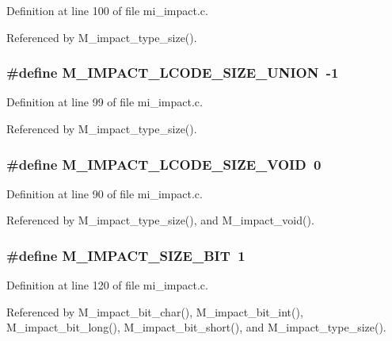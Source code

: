 Definition at line 100 of file mi\_\-impact.c.

Referenced by M\_\-impact\_\-type\_\-size().
\subsubsection{\setlength{\rightskip}{0pt plus 5cm}\#define M\_\-IMPACT\_\-LCODE\_\-SIZE\_\-UNION~-1}\label{mi__impact_8c_5d554a1c6dc4733ea2cddc22f4ea47f4}




Definition at line 99 of file mi\_\-impact.c.

Referenced by M\_\-impact\_\-type\_\-size().
\subsubsection{\setlength{\rightskip}{0pt plus 5cm}\#define M\_\-IMPACT\_\-LCODE\_\-SIZE\_\-VOID~0}\label{mi__impact_8c_13f29101fdb38b26b58fccbe1401f4f5}




Definition at line 90 of file mi\_\-impact.c.

Referenced by M\_\-impact\_\-type\_\-size(), and M\_\-impact\_\-void().
\subsubsection{\setlength{\rightskip}{0pt plus 5cm}\#define M\_\-IMPACT\_\-SIZE\_\-BIT~1}\label{mi__impact_8c_3ac692b34eb14d3d4372a0b83ad07543}




Definition at line 120 of file mi\_\-impact.c.

Referenced by M\_\-impact\_\-bit\_\-char(), M\_\-impact\_\-bit\_\-int(), M\_\-impact\_\-bit\_\-long(), M\_\-impact\_\-bit\_\-short(), and M\_\-impact\_\-type\_\-size().
